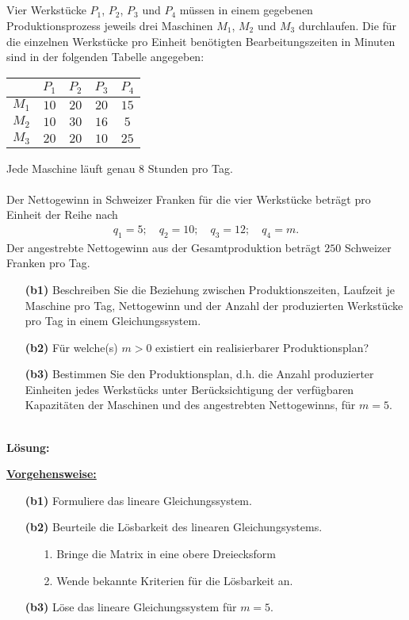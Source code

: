 \subsection*{}
Vier Werkstücke $P_1$, $P_2$, $P_3$ und $P_4$ müssen in einem gegebenen Produktionsprozess jeweils drei Maschinen $M_1$, $M_2$ und $M_3$ durchlaufen.
Die für die einzelnen Werkstücke pro Einheit benötigten Bearbeitungszeiten in Minuten sind in der folgenden Tabelle angegeben: 
\begin{table}[H]
	\centering
	\begin{tabular}{c | c c c c}
		$ $  & $P_1$  &  $P_2$ &  $P_3$ & $P_4$ \\ 
		\hline
		$ M_1 $ & $ 10 $ & $ 20 $ & $ 20 $ & $15$  \\ 
		$ M_2 $ & $ 10 $ & $ 30 $ & $ 16 $ & $5$ \\
		$ M_3 $ & $ 20 $ & $ 20 $ & $ 10 $ & $25$
	\end{tabular}%
\end{table}
Jede Maschine läuft genau $8$ Stunden pro Tag.\\
\\
Der Nettogewinn in Schweizer Franken für die vier Werkstücke beträgt pro Einheit der Reihe nach
\begin{align*}
	q_1 = 5; \quad
	q_2=  10; \quad
	q_3=12; \quad 
	q_4=m.
\end{align*}
Der angestrebte Nettogewinn aus der Gesamtproduktion beträgt $250$ Schweizer Franken pro Tag.
\begin{enumerate}
	\item[\textbf{(b1)}]
	Beschreiben Sie die Beziehung zwischen Produktionszeiten, Laufzeit je Maschine pro Tag, Nettogewinn und der Anzahl der produzierten Werkstücke pro Tag in einem Gleichungssystem.
	
	\item[\textbf{(b2)}] 
	Für welche(s) $m > 0$ existiert ein realisierbarer Produktionsplan?
	\item[\textbf{(b3)}]
	Bestimmen Sie den Produktionsplan, d.h. die Anzahl produzierter Einheiten jedes Werkstücks unter Berücksichtigung der verfügbaren Kapazitäten der Maschinen und des angestrebten Nettogewinns, für $m = 5$.
\end{enumerate}
\ \\
\textbf{Lösung:}
\begin{mdframed}
\underline{\textbf{Vorgehensweise:}}
\renewcommand{\labelenumi}{\theenumi.}
\begin{enumerate}
\item[\textbf{(b1)}] Formuliere das lineare Gleichungssystem.
\item[\textbf{(b2)}] Beurteile die Lösbarkeit des linearen Gleichungsystems.
\begin{enumerate}
	\item[1.] Bringe die Matrix in eine obere Dreiecksform
	\item[2.] Wende bekannte Kriterien für die Lösbarkeit an.
\end{enumerate}
\item[\textbf{(b3)}] Löse das lineare Gleichungssystem für $m = 5$.
\end{enumerate}
\end{mdframed}

